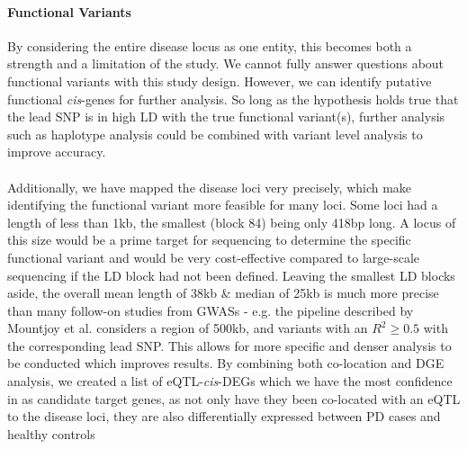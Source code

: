 \documentclass{article}
\begin{document}
\paragraph{Functional Variants}By considering the entire disease locus as one entity, this becomes both a strength and a limitation of the study. We cannot fully answer questions about functional variants with this study design. However, we can identify putative functional \textit{cis}-genes for further analysis.  So long as the hypothesis holds true that the lead SNP is in high LD with the true functional variant(s), further analysis such as haplotype analysis could be combined with variant level analysis to improve accuracy\cite{Liang2020HaplotypePhenotypes}. 
\\
\\Additionally, we have mapped the disease loci very precisely, which make identifying the functional variant more feasible for many loci. Some loci had a length of less than 1kb, the smallest (block 84) being only 418bp long. A locus of this size would be a prime target for sequencing to determine the specific functional variant and would be very cost-effective compared to large-scale sequencing if the LD block had not been defined. Leaving the smallest LD blocks aside, the overall mean length of 38kb \& median of 25kb is much more precise than many follow-on studies from GWASs - e.g. the pipeline described by Mountjoy et al.\cite{Mountjoy2021AnLoci} considers a region of 500kb, and variants with an $R^2\geq0.5$ with the corresponding lead SNP. This allows for more specific and denser analysis to be conducted which improves results\cite{Giambartolomei2014BayesianStatistics}. By combining both co-location and DGE analysis, we created a list of eQTL-\textit{cis}-DEGs which we have the most confidence in as candidate target genes, as not only have they been co-located with an eQTL to the disease loci, they are also differentially expressed between PD cases and healthy controls
\end{document}

